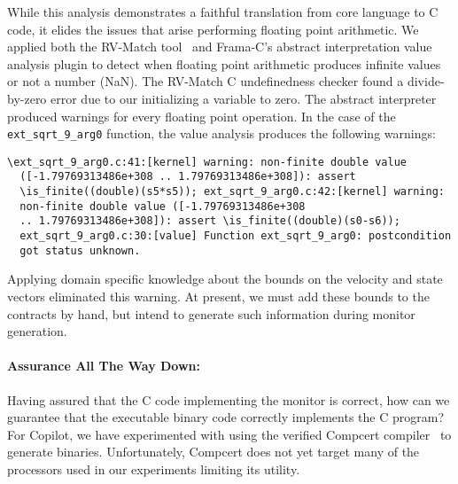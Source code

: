 While this analysis demonstrates a faithful translation from
core language to C code, it elides the issues that arise performing
floating point arithmetic.  We applied both the RV-Match
tool~\cite{RV-Match} and Frama-C's abstract interpretation value
analysis plugin to detect when floating point arithmetic produces
infinite values or not a number (NaN).  The RV-Match C undefinedness
checker found a divide-by-zero error due to our initializing a
variable to zero.  The abstract interpreter produced warnings for
every floating point operation. In the case of the
\texttt{ext\_sqrt\_9\_arg0} function, the value analysis produces the following
warnings: 
\begin{Verbatim}[fontsize=\scriptsize]
  \ext_sqrt_9_arg0.c:41:[kernel] warning: non-finite double value
  ([-1.79769313486e+308 .. 1.79769313486e+308]): assert
  \is_finite((double)(s5*s5)); ext_sqrt_9_arg0.c:42:[kernel] warning:
  non-finite double value ([-1.79769313486e+308
  .. 1.79769313486e+308]): assert \is_finite((double)(s0-s6));
  ext_sqrt_9_arg0.c:30:[value] Function ext_sqrt_9_arg0: postcondition
  got status unknown.
\end{Verbatim}
Applying domain specific knowledge about  the  bounds on the velocity and state
vectors  eliminated this
warning.  At present, we must add these bounds to the
contracts by hand, but intend to generate  such
information during monitor generation.  

\paragraph{Assurance All The Way Down:} 
Having assured that the C code implementing the monitor is correct,
how can we guarantee that the executable binary code correctly
implements the C program?  For Copilot, we have experimented
with using the verified Compcert compiler~\cite{leroy} to generate
binaries.  Unfortunately, Compcert does not yet target many of the
processors used in our experiments limiting its utility.





